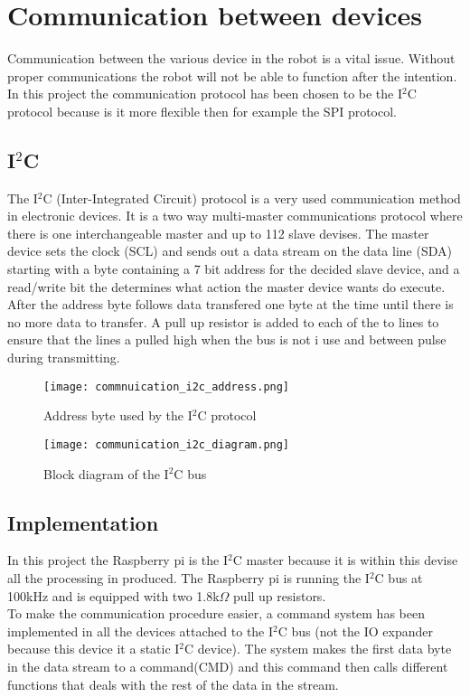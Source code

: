 \chapter{Communication between devices}
Communication between the various device in the robot is a vital issue. Without proper communications the robot will not be able to function after the intention. In this project the communication protocol has been chosen to be the I$^2$C protocol because is it more flexible then for example the SPI protocol.    
\section{I$^2$C}
The I$^2$C (Inter-Integrated Circuit) protocol is a very used communication method in electronic devices. It is a two way multi-master communications protocol where there is one interchangeable master and up to 112 slave devises. The master device sets the clock (SCL) and sends out a data stream on the data line (SDA) starting with a byte containing a 7 bit address for the decided slave device, and a read/write bit the determines what action the master device wants do execute. After the address byte follows data transfered one byte at the time until there is no more data to transfer. A pull up resistor is added to each of the to lines to ensure that the lines a pulled high when the bus is not i use and between pulse during transmitting.

\begin{figure}[!h]
	\centering
	\texttt{[image: commnuication\_i2c\_address.png]}
	\caption{Address byte used by the I$^2$C protocol}
	\label{fig:communication_I2C_address}
\end{figure}


\begin{figure}[!h]
	\centering
	\texttt{[image: communication\_i2c\_diagram.png]}
	\caption{Block diagram of the I$^2$C bus}
	\label{fig:communication_I2C_diagram}
\end{figure}
\newpage
\section{Implementation}
In this project the Raspberry pi is the I$^2$C master because it is within this devise all the processing in produced. The Raspberry pi is running the I$^2$C bus at 100kHz and is equipped with two 1.8k$\Omega$ pull up resistors.\\ To make the communication procedure easier, a command system has been implemented in all the devices attached to the I$^2$C bus (not the IO expander because this device it a static I$^2$C device). The system makes the first data byte in the data stream to a command(CMD) and this command then calls different functions that deals with the rest of the data in the stream.   



